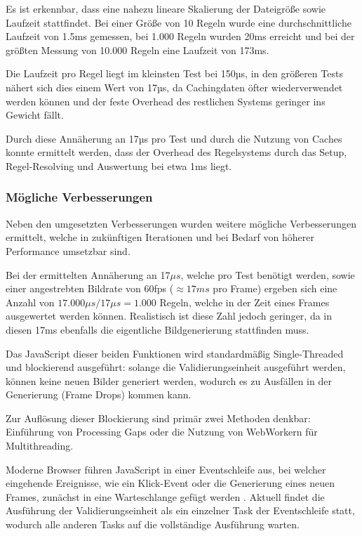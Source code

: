 \medskip

Es ist erkennbar, dass eine nahezu lineare Skalierung der Dateigröße sowie Laufzeit stattfindet. Bei einer Größe von 10 Regeln wurde eine durchschnittliche Laufzeit von 1.5ms gemessen, bei 1.000 Regeln wurden 20ms erreicht und bei der größten Messung von 10.000 Regeln eine Laufzeit von 173ms.

Die Laufzeit pro Regel liegt im kleinsten Test bei 150µs, in den größeren Tests nähert sich dies einem Wert von 17µs, da Cachingdaten öfter wiederverwendet werden können und der feste Overhead des restlichen Systems geringer ins Gewicht fällt.

Durch diese Annäherung an 17µs pro Test und durch die Nutzung von Caches konnte ermittelt werden, dass der Overhead des Regelsystems durch das Setup, Regel-Resolving und Auswertung bei etwa 1ms liegt.

\subsubsection{Mögliche Verbesserungen}

Neben den umgesetzten Verbesserungen wurden weitere mögliche Verbesserungen ermittelt, welche in zukünftigen Iterationen und bei Bedarf von höherer Performance umsetzbar sind.

Bei der ermittelten Annäherung an 17$\mu s$, welche pro Test benötigt werden, sowie einer angestrebten Bildrate von 60fps ($\approx 17ms$ pro Frame) ergeben sich eine Anzahl von $17.000\mu s / 17\mu s = 1.000$ Regeln, welche in der Zeit eines Frames ausgewertet werden können. Realistisch ist diese Zahl jedoch geringer, da in diesen 17ms ebenfalls die eigentliche Bildgenerierung stattfinden muss.

\medskip

Das JavaScript dieser beiden Funktionen wird standardmäßig Single-Threaded und blockierend ausgeführt: solange die Validierungseinheit ausgeführt werden, können keine neuen Bilder generiert werden, wodurch es zu Ausfällen in der Generierung (Frame Drops) kommen kann. 

Zur Auflösung dieser Blockierung sind primär zwei Methoden denkbar: Einführung von Processing Gaps oder die Nutzung von WebWorkern für Multithreading.

Moderne Browser führen JavaScript in einer Eventschleife aus, bei welcher eingehende Ereignisse, wie ein Klick-Event oder die Generierung eines neuen Frames, zunächst in eine Warteschlange gefügt werden \parencite{mdncontributorsJavaScriptExecutionModel2025}. Aktuell findet die Ausführung der Validierungseinheit als ein einzelner Task der Eventschleife statt, wodurch alle anderen Tasks auf die vollständige Ausführung warten.

